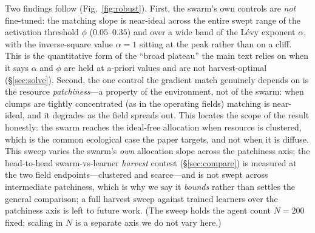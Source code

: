 \documentclass{article}
\begin{document}
Two findings follow (Fig.~\ref{fig:robust}). First, the swarm's own controls are \emph{not} fine-tuned: the
matching slope is near-ideal across the entire swept range of the activation threshold $\phi$ ($0.05$--$0.35$) and
over a wide band of the L\'evy exponent $\alpha$, with the inverse-square value $\alpha{=}1$ sitting at the peak
rather than on a cliff. This is the quantitative form of the ``broad plateau'' the main text relies on when it
says $\alpha$ and $\phi$ are held at a-priori values and are not harvest-optimal (\S\ref{sec:solve}). Second, the
one control the gradient match genuinely depends on is the resource \emph{patchiness}---a property of the
environment, not of the swarm: when clumps are tightly concentrated (as in the operating fields) matching is
near-ideal, and it degrades as the field spreads out. This locates the scope of the result honestly: the swarm
reaches the ideal-free allocation when resource is clustered, which is the common ecological case the paper
targets, and not when it is diffuse. This sweep varies the swarm's \emph{own} allocation slope across the
patchiness axis; the head-to-head swarm-vs-learner \emph{harvest} contest (\S\ref{sec:compare}) is measured at the
two field endpoints---clustered and scarce---and is not swept across intermediate patchiness, which is why we say
it \emph{bounds} rather than settles the general comparison; a full harvest sweep against trained learners over
the patchiness axis is left to future work. (The sweep holds the agent count $N{=}200$ fixed; scaling in $N$ is a
separate axis we do not vary here.)
\end{document}
